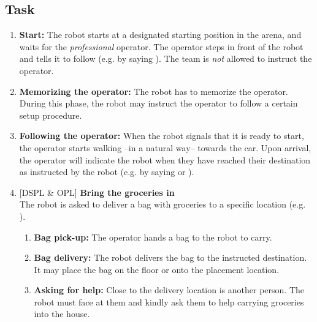 \subsection{Task}
\begin{enumerate}
  \item \textbf{Start:} The robot starts at a designated starting position in the arena, and waits for the \textit{professional} operator. The operator steps in front of the robot and tells it to follow (e.g. by saying ). The team is \emph{not} allowed to instruct the operator.

  \item \textbf{Memorizing the operator:} The robot has to memorize the operator. During this phase, the robot may instruct the operator to follow a certain setup procedure.

  \item \textbf{Following the operator:} When the robot signals that it is ready to start, the operator starts walking --in a natural way-- towards the car. Upon arrival, the operator will indicate the robot when they have reached their destination as instructed by the robot (e.g. by saying  or ).

  \setcounter{enumTemp}{\theenumi}
  \item {[DSPL \& OPL]} \textbf{Bring the groceries in} \\
  The robot is asked to deliver a bag with groceries to a specific location (e.g. ).
  \begin{enumerate}
    \item \textbf{Bag pick-up:} The operator hands a bag to the robot to carry.

    \item \textbf{Bag delivery:} The robot delivers the bag to the instructed destination. It may place the bag on the floor or onto the placement location.

    \item \textbf{Asking for help:} Close to the delivery location is another person. The robot must face at them and kindly ask them to help carrying groceries into the house.
  \end{enumerate}


\end{enumerate}
